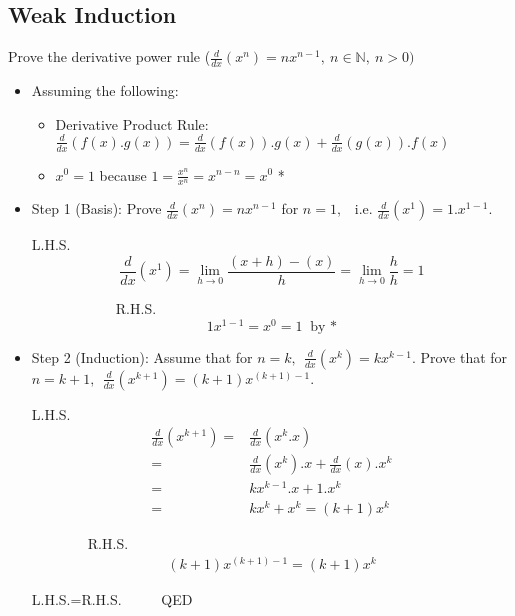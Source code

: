 \documentclass[11pt]{article}
\newtheorem*{General Definition}{General Definition}
\theoremstyle{definition}
\begin{document}
\subsection*{Weak Induction} 
Prove the derivative power rule ($\frac{d}{dx} (x^n) = nx^{n-1}, \ n\in \mathbb{N}, \ n>0)$
\begin{itemize}
\item Assuming the following: 
\begin{itemize}
	\item Derivative Product Rule: $\frac{d}{dx} (f(x).g(x)) = \frac{d}{dx}(f(x)) . g(x) + \frac{d}{dx}(g(x)) . f(x)$
	\item $x^0=1$ because $1= \frac {x^n}{x^n}=x^{n-n}=x^0$ *
\end{itemize}
\item Step 1 (Basis): Prove $\frac{d}{dx}(x^n)=nx^{n-1}$ for $n=1,$ \ i.e. $\frac{d}{dx}(x^1)=1.x^{1-1}.$
\begin{multicols}{2}
L.H.S.
$$\frac{d}{dx}(x^1)= \lim_{h \rightarrow 0}{\frac{(x+h)-(x)}{h}}
				 = \lim_{h \rightarrow 0}{\frac{h}{h}}
				 = 1$$

\columnbreak
\ \ \ \ \ \ \ \ \ \ \ \ R.H.S. 
$$1x^{1-1}=  x^0
		= 1 \ \text{ by *} $$ 
\end{multicols}

\item Step 2 (Induction): Assume that for $n=k,\ \ \frac {d}{dx} (x^k)= k x^{k-1}.$ 
\newline Prove that for $n=k+1, \ \ \frac {d}{dx} (x^{k+1})=(k+1)x^{(k+1)-1}.$
\begin{multicols}{2}
L.H.S.
\begin{align*}
\frac{d}{dx}(x^{k+1})= &\frac{d}{dx}(x^{k}.x)\\
				 = & \frac{d}{dx}(x^{k}).x +\frac{d}{dx}(x).x^{k}\\
				 = & kx^{k-1}.x +1.x^k \\
				 = & kx^{k} +x^k = (k+1)x^k
\end{align*}

\columnbreak
\ \ \ \ \ \ \  \ R.H.S. 
\begin{align*}
(k+1)x^{(k+1)-1}=(k+1)x^k
\end{align*}
\end{multicols}
L.H.S.=R.H.S. \ \ \ \ \ QED
\end{itemize}
\end{document}
